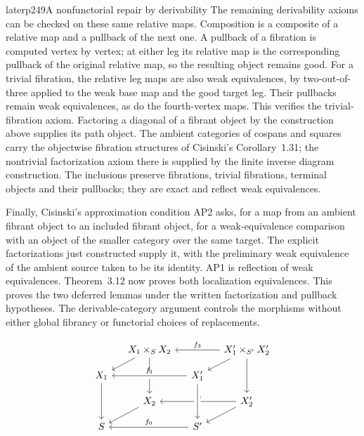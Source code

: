 \begin{dcomment}{later}{p249}{A nonfunctorial repair by derivability}
The remaining derivability axioms can be checked on these same relative maps. Composition is a composite of a relative map and a pullback of the next one. A pullback of a fibration is computed vertex by vertex; at either leg its relative map is the corresponding pullback of the original relative map, so the resulting object remains good. For a trivial fibration, the relative leg maps are also weak equivalences, by two-out-of-three applied to the weak base map and the good target leg. Their pullbacks remain weak equivalences, as do the fourth-vertex maps. This verifies the trivial-fibration axiom. Factoring a diagonal of a fibrant object by the construction above supplies its path object. The ambient categories of cospans and squares carry the objectwise fibration structures of Cisinski's Corollary~1.31; the nontrivial factorization axiom there is supplied by the finite inverse diagram construction. The inclusions preserve fibrations, trivial fibrations, terminal objects and their pullbacks; they are exact and reflect weak equivalences.

Finally, Cisinski's approximation condition AP2 asks, for a map from an ambient fibrant object to an included fibrant object, for a weak-equivalence comparison with an object of the smaller category over the same target. The explicit factorizations just constructed supply it, with the preliminary weak equivalence of the ambient source taken to be its identity. AP1 is reflection of weak equivalences. Theorem~3.12 now proves both localization equivalences. This proves the two deferred lemmas under the written factorization and pullback hypotheses. The derivable-category argument controls the morphisms without either global fibrancy or functorial choices of replacements.
\end{dcomment}


\[
\begin{tikzcd}[ampersand replacement=\&, row sep=small, column sep=small]
 \& X_1\times_S X_2 \arrow[dl] \arrow[dd] \& \& X'_1\times_{S'}X'_2 \arrow[ll, "f_3"'] \arrow[dl] \arrow[dd] \\
X_1 \arrow[dd] \& \& X'_1 \arrow[ll, crossing over, "f_1"'] \& \\
 \& X_2 \arrow[dl] \& \& X'_2 \arrow[ll, "f_2"'] \arrow[dl] \\
S \& \& S' \arrow[ll, "f_0"'] \arrow[from=uu, crossing over] \&
\end{tikzcd}
\]

